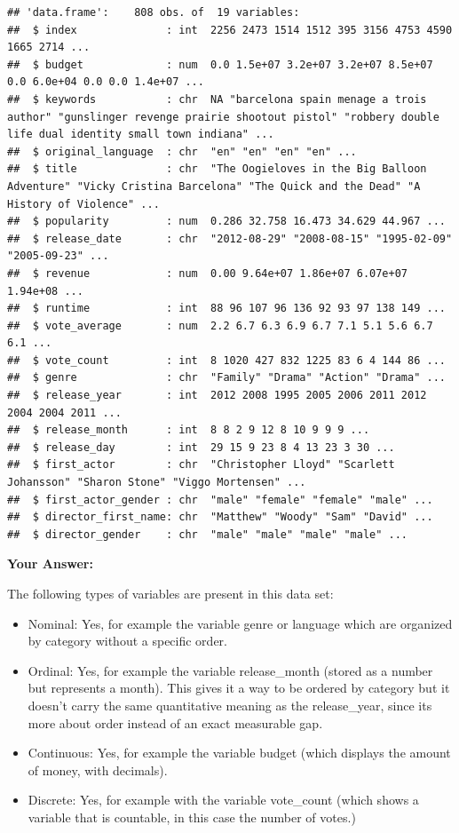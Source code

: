 \documentclass[
]{article}
\begin{document}
\begin{verbatim}
## 'data.frame':    808 obs. of  19 variables:
##  $ index              : int  2256 2473 1514 1512 395 3156 4753 4590 1665 2714 ...
##  $ budget             : num  0.0 1.5e+07 3.2e+07 3.2e+07 8.5e+07 0.0 6.0e+04 0.0 0.0 1.4e+07 ...
##  $ keywords           : chr  NA "barcelona spain menage a trois author" "gunslinger revenge prairie shootout pistol" "robbery double life dual identity small town indiana" ...
##  $ original_language  : chr  "en" "en" "en" "en" ...
##  $ title              : chr  "The Oogieloves in the Big Balloon Adventure" "Vicky Cristina Barcelona" "The Quick and the Dead" "A History of Violence" ...
##  $ popularity         : num  0.286 32.758 16.473 34.629 44.967 ...
##  $ release_date       : chr  "2012-08-29" "2008-08-15" "1995-02-09" "2005-09-23" ...
##  $ revenue            : num  0.00 9.64e+07 1.86e+07 6.07e+07 1.94e+08 ...
##  $ runtime            : int  88 96 107 96 136 92 93 97 138 149 ...
##  $ vote_average       : num  2.2 6.7 6.3 6.9 6.7 7.1 5.1 5.6 6.7 6.1 ...
##  $ vote_count         : int  8 1020 427 832 1225 83 6 4 144 86 ...
##  $ genre              : chr  "Family" "Drama" "Action" "Drama" ...
##  $ release_year       : int  2012 2008 1995 2005 2006 2011 2012 2004 2004 2011 ...
##  $ release_month      : int  8 8 2 9 12 8 10 9 9 9 ...
##  $ release_day        : int  29 15 9 23 8 4 13 23 3 30 ...
##  $ first_actor        : chr  "Christopher Lloyd" "Scarlett Johansson" "Sharon Stone" "Viggo Mortensen" ...
##  $ first_actor_gender : chr  "male" "female" "female" "male" ...
##  $ director_first_name: chr  "Matthew" "Woody" "Sam" "David" ...
##  $ director_gender    : chr  "male" "male" "male" "male" ...
\end{verbatim}

\textbf{Your Answer:}

The following types of variables are present in this data set:

\begin{itemize}
\item
  Nominal: Yes, for example the variable genre or language which are
  organized by category without a specific order.
\item
  Ordinal: Yes, for example the variable release\_month (stored as a
  number but represents a month). This gives it a way to be ordered by
  category but it doesn't carry the same quantitative meaning as the
  release\_year, since its more about order instead of an exact
  measurable gap.
\item
  Continuous: Yes, for example the variable budget (which displays the
  amount of money, with decimals).
\item
  Discrete: Yes, for example with the variable vote\_count (which shows
  a variable that is countable, in this case the number of votes.)
\end{itemize}
\end{document}
